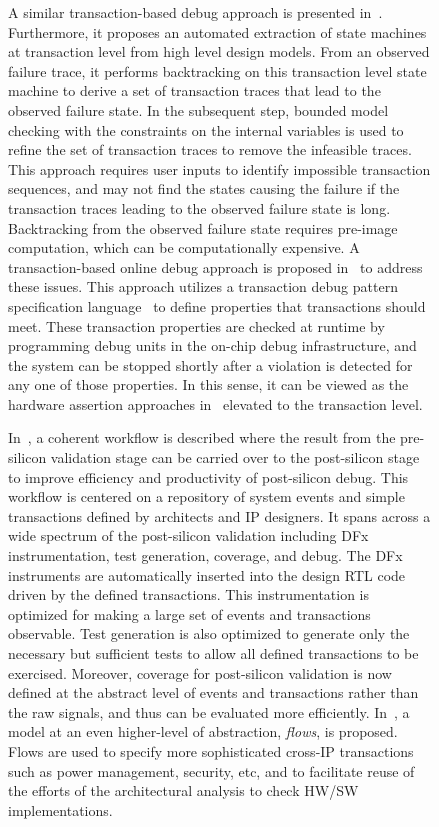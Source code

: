 \documentclass[conference]{IEEEtran}
\begin{document}
\begin{figure}
A similar transaction-based debug approach is presented in~\cite{Gharehbaghi2012ISQED}.  Furthermore, it proposes an automated extraction of state machines at transaction level from  high level design models.  From an observed failure trace, it performs backtracking on this transaction level state machine to derive a set of transaction traces that lead to the observed failure state.  In the subsequent step, bounded model checking with the constraints on the internal variables is used to refine the set of transaction traces to remove the infeasible traces.  This approach requires user inputs to identify impossible transaction sequences, and may not find the states causing the failure if the transaction traces leading to the observed failure state is long.  Backtracking from the observed failure state requires pre-image computation, which can be computationally expensive.  A transaction-based online debug approach is proposed in~\cite{Dehbash2014} to address these issues.  This approach utilizes a transaction debug pattern specification language~\cite{Gharehbaghi2009ICCD} to define properties that transactions should meet.  These transaction properties are checked at runtime by programming debug units in the on-chip debug infrastructure, and the system can be stopped shortly after a violation is detected for any one of those properties.  In this sense, it can be viewed as the hardware assertion approaches in~\cite{Boule2007ISQED} elevated to the transaction level. 

In~\cite{Singerman2011DAC}, a coherent workflow is described where the result from the pre-silicon validation stage can be carried over to the post-silicon stage to improve efficiency and productivity of post-silicon debug.  This workflow is centered on a repository of system events and simple transactions defined by architects and IP designers.  It spans across a wide spectrum of the post-silicon validation including DFx instrumentation, test generation, coverage, and debug.  The DFx instruments are automatically inserted into the design RTL code driven by the defined transactions.  This instrumentation is optimized for making a large set of events and transactions observable.   Test generation is also optimized to generate only the necessary but sufficient tests to allow all defined transactions to be exercised.   Moreover, coverage for post-silicon validation is now defined at the abstract level of events and transactions rather than the raw signals, and thus can be evaluated more efficiently.  In~\cite{Abarbanel2014DAC}, a model at an even higher-level of abstraction, {\em flows}, is proposed.  Flows are used to specify more sophisticated cross-IP transactions such as power management, security, etc, and to facilitate reuse of the efforts of the architectural analysis to check HW/SW implementations. 



\end{figure}
\end{document}
